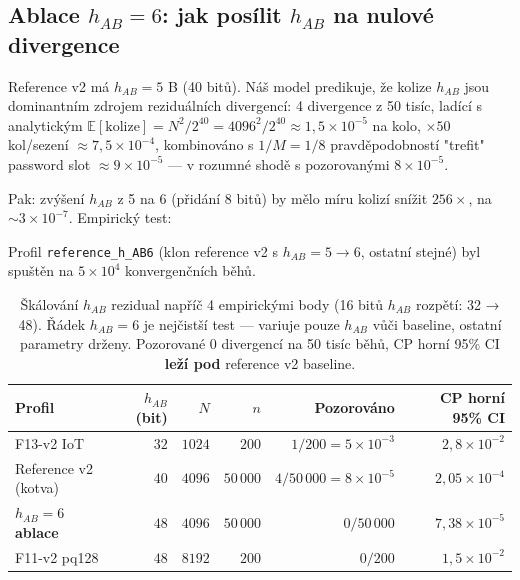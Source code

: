 \documentclass[11pt,a4paper]{article}
\begin{document}
\subsection{Ablace $h_{AB} = 6$: jak posílit $h_{AB}$ na nulové divergence}\label{pop:exp-habresidual}

Reference v2 má $h_{AB} = 5$ B (40 bitů). Náš model predikuje, že kolize $h_{AB}$ jsou dominantním zdrojem reziduálních divergencí: 4 divergence z 50 tisíc, ladící s analytickým $\mathbb{E}[\text{kolize}] = N^2 / 2^{40} = 4096^2 / 2^{40} \approx 1{,}5 \times 10^{-5}$ na kolo, $\times 50$ kol/sezení $\approx 7{,}5 \times 10^{-4}$, kombinováno s $1/M=1/8$ pravděpodobností "trefit" password slot $\approx 9 \times 10^{-5}$ --- v rozumné shodě s pozorovanými $8 \times 10^{-5}$.

Pak: zvýšení $h_{AB}$ z 5 na 6 (přidání 8 bitů) by mělo míru kolizí snížit $256\times$, na $\sim 3 \times 10^{-7}$. Empirický test:

Profil \texttt{reference\_h\_AB6} (klon reference v2 s $h_{AB} = 5 \to 6$, ostatní stejné) byl spuštěn na $5 \times 10^4$ konvergenčních běhů.

\begin{table}[ht]
\centering
\small
\begin{tabular}{lrrrrr}
\toprule
\textbf{Profil} & \textbf{$h_{AB}$ (bit)} & \textbf{$N$} & \textbf{$n$} & \textbf{Pozorováno} & \textbf{CP horní 95\% CI} \\
\midrule
F13-v2 IoT             & $32$ & $1024$ & $200$ & $1/200 = 5 \times 10^{-3}$ & $2{,}8 \times 10^{-2}$ \\
Reference v2 (kotva) & $40$ & $4096$ & $50\,000$ & $4/50\,000 = 8 \times 10^{-5}$ & $2{,}05 \times 10^{-4}$ \\
\textbf{$h_{AB}=6$ ablace} & \textbf{$48$} & \textbf{$4096$} & \textbf{$50\,000$} & \textbf{$0/50\,000$} & \textbf{$7{,}38 \times 10^{-5}$} \\
F11-v2 pq128 & $48$ & $8192$ & $200$ & $0/200$ & $1{,}5 \times 10^{-2}$ \\
\bottomrule
\end{tabular}
\caption{Škálování $h_{AB}$ rezidual napříč 4 empirickými body (16 bitů $h_{AB}$ rozpětí: 32 → 48). Řádek $h_{AB}=6$ je nejčistší test --- variuje pouze $h_{AB}$ vůči baseline, ostatní parametry drženy. Pozorované 0 divergencí na 50 tisíc běhů, CP horní 95\% CI \textbf{leží pod} reference v2 baseline.}
\label{tab:pop-hab-scaling}
\end{table}
\end{document}

